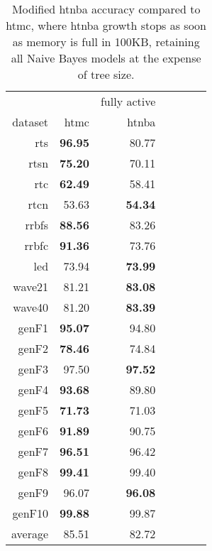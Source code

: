 \begin{table}
\caption{Modified {\sc htnba} accuracy compared to {\sc htmc}, where {\sc htnba} growth stops as soon as memory is full in 100KB, retaining all Naive Bayes models at the expense of tree size.}
\label{tab:htmc_vs_htnbstop_acc}
\centering
\begin{tabular}{|r||r|r|r||r|r|r|}
\hline
 & & fully active \\
dataset & {\sc htmc} & {\sc htnba} \\
\hline
{\sc rts} & \textbf{96.95} & 80.77 \\
{\sc rtsn} & \textbf{75.20} & 70.11 \\
{\sc rtc} & \textbf{62.49} & 58.41\\
{\sc rtcn} & 53.63 & \textbf{54.34} \\
{\sc rrbfs} & \textbf{88.56} & 83.26 \\
{\sc rrbfc} & \textbf{91.36} & 73.76\\
{\sc led} & 73.94 & \textbf{73.99} \\
{\sc wave21} & 81.21 & \textbf{83.08} \\
{\sc wave40} & 81.20 & \textbf{83.39} \\
{\sc genF1} & \textbf{95.07} & 94.80 \\
{\sc genF2} & \textbf{78.46} & 74.84\\
{\sc genF3} & 97.50 & \textbf{97.52} \\
{\sc genF4} & \textbf{93.68} & 89.80 \\
{\sc genF5} & \textbf{71.73} & 71.03 \\
{\sc genF6} & \textbf{91.89} & 90.75 \\
{\sc genF7} & \textbf{96.51} &  96.42\\
{\sc genF8} & \textbf{99.41} & 99.40 \\
{\sc genF9} & 96.07 & \textbf{96.08} \\
{\sc genF10} & \textbf{99.88} & 99.87 \\
\hline
average & 85.51 & 82.72 \\
\hline
\end{tabular}
\end{table}

